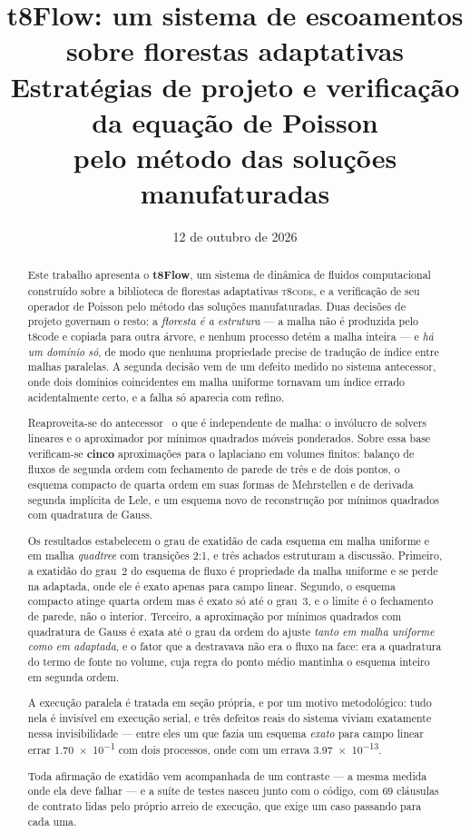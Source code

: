 \documentclass[11pt,a4paper]{article}
\title{t8Flow: um sistema de escoamentos sobre florestas adaptativas\\
       \large Estratégias de projeto e verificação da equação de Poisson\\
       pelo método das soluções manufaturadas}
\author{\falta{autores}}
\date{12 de outubro de 2026}
\begin{document}
\maketitle

\begin{abstract}
Este trabalho apresenta o \textbf{t8Flow}, um sistema de dinâmica de fluidos
computacional construído sobre a biblioteca de florestas adaptativas
\textsc{t8code}, e a verificação de seu operador de Poisson pelo método das
soluções manufaturadas. Duas decisões de projeto governam o resto: a
\emph{floresta é a estrutura} --- a malha não é produzida pelo t8code e copiada
para outra árvore, e nenhum processo detém a malha inteira --- e \emph{há um
domínio só}, de modo que nenhuma propriedade precise de tradução de índice entre
malhas paralelas. A segunda decisão vem de um defeito medido no sistema
antecessor, onde dois domínios coincidentes em malha uniforme tornavam um índice
errado acidentalmente certo, e a falha só aparecia com refino.

Reaproveita-se do antecessor~\cite{sousa2019} o que é independente de malha: o invólucro de
solvers lineares e o aproximador por mínimos quadrados móveis ponderados. Sobre
essa base verificam-se \textbf{cinco} aproximações para o laplaciano em volumes
finitos: balanço de fluxos de segunda ordem com fechamento de parede de três e de
dois pontos, o esquema compacto de quarta ordem em suas formas de Mehrstellen e
de derivada segunda implícita de Lele, e um esquema novo de reconstrução por
mínimos quadrados com quadratura de Gauss.

Os resultados estabelecem o grau de exatidão de cada esquema em malha uniforme e
em malha \emph{quadtree} com transições 2:1, e três achados estruturam a
discussão. Primeiro, a exatidão do grau~2 do esquema de fluxo é propriedade da
malha uniforme e se perde na adaptada, onde ele é exato apenas para campo linear.
Segundo, o esquema compacto atinge quarta ordem mas é exato só até o grau~3, e o
limite é o fechamento de parede, não o interior. Terceiro, a aproximação por
mínimos quadrados com quadratura de Gauss é exata até o grau da ordem do ajuste
\emph{tanto em malha uniforme como em adaptada}, e o fator que a destravava não
era o fluxo na face: era a quadratura do termo de fonte no volume, cuja regra do
ponto médio mantinha o esquema inteiro em segunda ordem.

A execução paralela é tratada em seção própria, e por um motivo metodológico:
tudo nela é invisível em execução serial, e três defeitos reais do sistema viviam
exatamente nessa invisibilidade --- entre eles um que fazia um esquema
\emph{exato} para campo linear errar \num{1.70e-1} com dois processos, onde com
um errava \num{3.97e-13}.

Toda afirmação de exatidão vem acompanhada de um contraste --- a mesma medida
onde ela deve falhar --- e a suíte de testes nasceu junto com o código, com
69 cláusulas de contrato lidas pelo próprio arreio de execução, que exige
um caso passando para cada uma.
\end{abstract}
\end{document}
